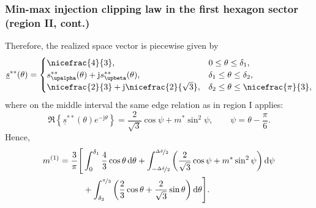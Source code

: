 \begin{frame}
    \frametitle{Min-max injection clipping law in the first hexagon sector (region II, cont.)}
    Therefore, the realized space vector is piecewise given by
    \begin{equation}
        \underline{s}^{**}(\theta) =
        \begin{cases}
            \nicefrac{4}{3},                                                & 0 \leq \theta \leq \delta_1,                 \\
            s_{\upalpha}^{**}(\theta) + \mathrm{j}s_{\upbeta}^{**}(\theta), & \delta_1 \leq \theta \leq \delta_2,          \\
            \nicefrac{2}{3} + \mathrm{j}\nicefrac{2}{\sqrt{3}},             & \delta_2 \leq \theta \leq \nicefrac{\pi}{3},
        \end{cases}
    \end{equation}\pause
    where on the middle interval the same edge relation as in region I applies:
    \begin{equation}
        \Re\!\left\{\underline{s}^{**}(\theta)e^{-\mathrm{j}\theta}\right\}
        = \frac{2}{\sqrt{3}}\cos\psi + m^*\sin^2\psi,
        \qquad \psi = \theta - \frac{\pi}{6}.
    \end{equation}\pause
    Hence,
    \begin{equation}
        \begin{split}
            m^{(1)} = \frac{3}{\pi}\Bigg[ & \int_{0}^{\delta_1} \frac{4}{3}\cos\theta\,\mathrm{d}\theta
                                       + \int_{-\nicefrac{\Delta\delta}{2}}^{\nicefrac{\Delta\delta}{2}}\left(\frac{2}{\sqrt{3}}\cos\psi + m^*\sin^2\psi\right)\mathrm{d}\psi                        \\
                                       & + \int_{\delta_2}^{\nicefrac{\pi}{3}}\left(\frac{2}{3}\cos\theta + \frac{2}{\sqrt{3}}\sin\theta\right)\mathrm{d}\theta\Bigg].
        \end{split}
    \end{equation}
\end{frame}

